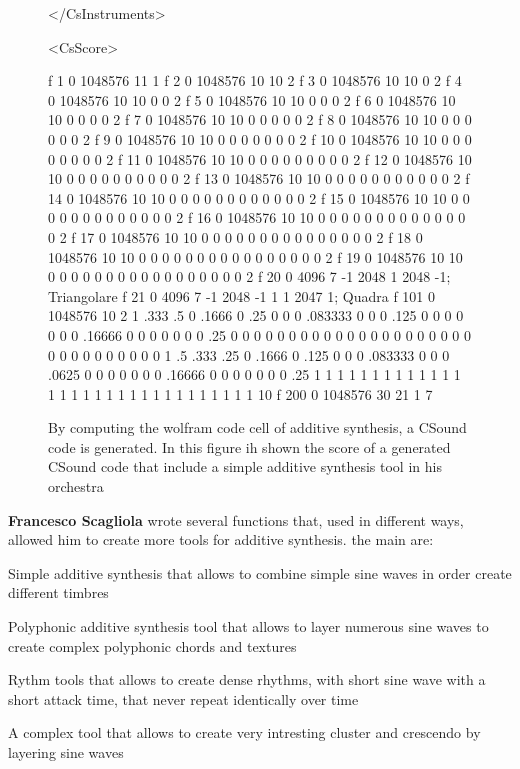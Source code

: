 		\begin{figure}[h]
			\begin{center}
				\begin{code}
					</CsInstruments>
					
					<CsScore>
					
					f 1 0 1048576 11  1 
					f 2 0 1048576 10  10 2
					f 3 0 1048576 10  10 0 2
					f 4 0 1048576 10  10 0 0 2
					f 5 0 1048576 10  10 0 0 0 2
					f 6 0 1048576 10  10 0 0 0 0 2
					f 7 0 1048576 10  10 0 0 0 0 0 2
					f 8 0 1048576 10  10 0 0 0 0 0 0 2
					f 9 0 1048576 10  10 0 0 0 0 0 0 0 2
					f 10 0 1048576 10 10 0 0 0 0 0 0 0 0 2
					f 11 0 1048576 10 10 0 0 0 0 0 0 0 0 0 2
					f 12 0 1048576 10 10 0 0 0 0 0 0 0 0 0 0 2
					f 13 0 1048576 10 10 0 0 0 0 0 0 0 0 0 0 0 2
					f 14 0 1048576 10 10 0 0 0 0 0 0 0 0 0 0 0 0 2
					f 15 0 1048576 10 10 0 0 0 0 0 0 0 0 0 0 0 0 0 2
					f 16 0 1048576 10 10 0 0 0 0 0 0 0 0 0 0 0 0 0 0 2
					f 17 0 1048576 10 10 0 0 0 0 0 0 0 0 0 0 0 0 0 0 0 2
					f 18 0 1048576 10 10 0 0 0 0 0 0 0 0 0 0 0 0 0 0 0 0 2
					f 19 0 1048576 10 10 0 0 0 0 0 0 0 0 0 0 0 0 0 0 0 0 0 2
					f 20 0 4096 7 -1 2048 1 2048 -1; Triangolare
					f 21 0 4096 7 -1 2048 -1  1 1  2047 1; Quadra
					f 101 0 1048576 10 2 1 .333 .5 0 .1666 0 .25 0 0 0 .083333 0 0 0 .125 0 0 0 0 0 0 0 .16666 0 0 0 0 0 0 0 .25 0 0 0 0 0 0 0 0 0 0 0 0 0 0 0 0 0 0 0 0 0 0 0 0 0 0 0 0 0 0 0 1 .5 .333 .25 0 .1666 0 .125 0 0 0 .083333 0 0 0 .0625 0 0 0 0 0 0 0 .16666 0 0 0 0 0 0 0 .25 1 1 1 1 1 1 1 1 1 1 1 1 1 1 1 1 1 1 1 1 1 1 1 1 1 1 1 1 1 1 1 10
					f 200 0 1048576 30 21 1 7
				\end{code}
				\caption{By computing the wolfram code cell of additive synthesis, a CSound code is generated. In this figure ih shown the score of a generated CSound code that include a simple additive synthesis tool in his orchestra}
			\end{center}
		\end{figure}
		
		\textbf{Francesco Scagliola} wrote several functions that, used in different ways, allowed him to create more tools for additive synthesis. the main are:
		
		\begin{compactitem}
			\item Simple additive synthesis that allows to combine simple sine waves in order create different timbres
			\item Polyphonic additive synthesis tool that allows to layer numerous sine waves to create complex polyphonic chords and textures
			\item Rythm tools that allows to create dense rhythms, with short sine wave with a short attack time, that never repeat identically over time
			\item A complex tool that allows to create very intresting cluster and crescendo by layering sine waves
		\end{compactitem}
		
